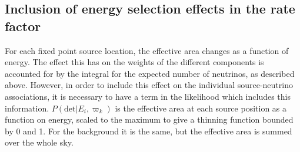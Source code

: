 \documentclass[fontsize=12pt]{article}
\begin{document}
\subsection{Inclusion of energy selection effects in the rate factor}
For each fixed point source location, the effective area changes as a function of energy. The effect this has on the weights of the different components is accounted for by the integral for the expected number of neutrinos, as described above. However, in order to include this effect on the individual source-neutrino associations, it is necessary to have a term in the likelihood which includes this information. $P(\mathrm{det} | E_i, \varpi_k)$ is the effective area at each source position as a function on energy, scaled to the maximum to give a thinning function bounded by 0 and 1. For the background it is the same, but the effective area is summed over the whole sky.    



\end{document}
